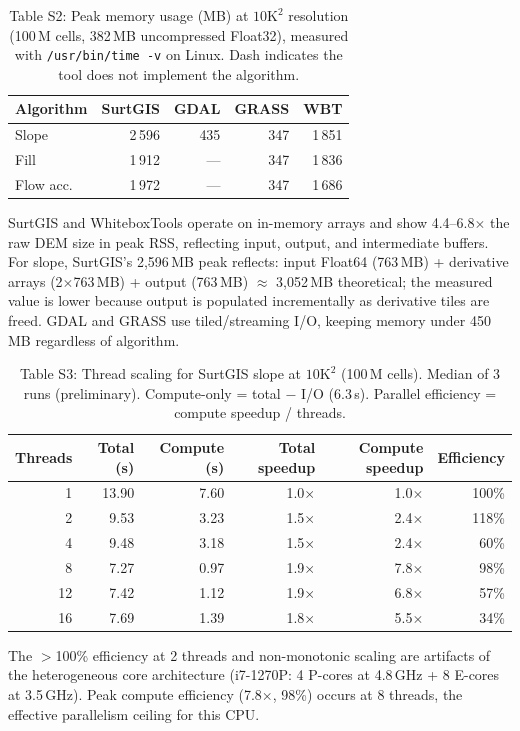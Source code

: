 \documentclass[11pt]{article}
\begin{document}
\begin{table}[htbp]
\centering
\caption*{Table S2: Peak memory usage (MB) at $10\text{K}^2$ resolution (100\,M cells, 382\,MB uncompressed Float32), measured with \texttt{/usr/bin/time -v} on Linux. Dash indicates the tool does not implement the algorithm.}
\begin{tabular}{@{}lrrrr@{}}
\toprule
Algorithm & SurtGIS & GDAL & GRASS & WBT \\
\midrule
Slope     & 2\,596  & 435  & 347   & 1\,851 \\
Fill      & 1\,912  & ---  & 347   & 1\,836 \\
Flow acc. & 1\,972  & ---  & 347   & 1\,686 \\
\bottomrule
\end{tabular}

\medskip
\small
SurtGIS and WhiteboxTools operate on in-memory arrays and show 4.4--6.8$\times$ the raw DEM size in peak RSS, reflecting input, output, and intermediate buffers. For slope, SurtGIS's 2{,}596\,MB peak reflects: input Float64 (763\,MB) + derivative arrays (2$\times$763\,MB) + output (763\,MB) $\approx$ 3{,}052\,MB theoretical; the measured value is lower because output is populated incrementally as derivative tiles are freed. GDAL and GRASS use tiled/streaming I/O, keeping memory under 450\,MB regardless of algorithm.
\end{table}

\begin{table}[htbp]
\centering
\caption*{Table S3: Thread scaling for SurtGIS slope at $10\text{K}^2$ (100\,M cells). Median of 3 runs (preliminary). Compute-only = total $-$ I/O (6.3\,s). Parallel efficiency = compute speedup / threads.}
\begin{tabular}{@{}rrrrrr@{}}
\toprule
Threads & Total (s) & Compute (s) & Total speedup & Compute speedup & Efficiency \\
\midrule
1  & 13.90 & 7.60 & 1.0$\times$ & 1.0$\times$ & 100\% \\
2  &  9.53 & 3.23 & 1.5$\times$ & 2.4$\times$ & 118\% \\
4  &  9.48 & 3.18 & 1.5$\times$ & 2.4$\times$ &  60\% \\
8  &  7.27 & 0.97 & 1.9$\times$ & 7.8$\times$ &  98\% \\
12 &  7.42 & 1.12 & 1.9$\times$ & 6.8$\times$ &  57\% \\
16 &  7.69 & 1.39 & 1.8$\times$ & 5.5$\times$ &  34\% \\
\bottomrule
\end{tabular}

\medskip
\small
The $>$100\% efficiency at 2 threads and non-monotonic scaling are artifacts of the heterogeneous core architecture (i7-1270P: 4 P-cores at 4.8\,GHz + 8 E-cores at 3.5\,GHz). Peak compute efficiency (7.8$\times$, 98\%) occurs at 8 threads, the effective parallelism ceiling for this CPU.
\end{table}
\end{document}
